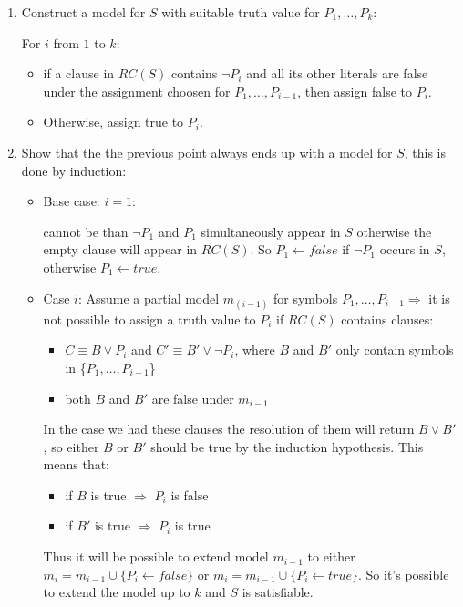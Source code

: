 \documentclass[12pt]{article}
\begin{document}
\begin{enumerate}[label=\textbf{PL.\arabic*}]
    \begin{enumerate}
        \item Construct a model for $S$ with suitable truth value for $P_1,\ldots,P_k$:
        
        For $i$ from $1$ to $k$:
        \begin{itemize}
            \item if a clause in $RC(S)$ contains $\lnot P_i$ and all its other literals are false under the assignment choosen for $P_1,\ldots,P_{i-1}$, 
            then assign false to $P_i$.
            \item Otherwise, assign true to $P_i$.       
        \end{itemize}
        \item Show that the the previous point always ends up with a model for $S$, this is done by induction:
        \begin{itemize}
            \item Base case: $i = 1$:
            
            cannot be than $\lnot P_1$ and $P_1$ simultaneously appear in $S$ otherwise the empty clause will appear in $RC(S)$.
            So $P_1 \leftarrow false$ if $\lnot P_1$ occurs in $S$, otherwise $P_1 \leftarrow true$.
            \item Case $i$: Assume a partial model $m_{(i-1)}$ for symbols $P_1,\ldots,P_{i-1}\Rightarrow$ it is not possible to assign a truth value to $P_i$ if $RC(S)$
            contains clauses:
            \begin{itemize}
                \item $C\equiv B\lor P_i$ and $C'\equiv B'\lor\lnot P_i$, where $B$ and $B'$ only contain symbols in \{$P_1,\ldots,P_{i-1}$\}
                \item both $B$ and $B'$ are false under $m_{i-1}$
            \end{itemize}
            In the case we had these clauses the resolution of them will return $B\lor B'$, so either $B$ or $B'$ should be true by the induction hypothesis. 
            This means that:
            \begin{itemize}
                \item if $B$ is true $\Rightarrow$ $P_i$ is false
                \item if $B'$ is true $\Rightarrow$ $P_i$ is true
            \end{itemize}
            Thus it will be possible to extend model $m_{i-1}$ to either $m_i = m_{i-1}\cup\{P_i \leftarrow false\}$ or $m_i = m_{i-1}\cup\{P_i \leftarrow true\}$.
            So it's possible to extend the model up to $k$ and $S$ is satisfiable.
        \end{itemize}
    \end{enumerate}
\end{enumerate}
\end{document}

